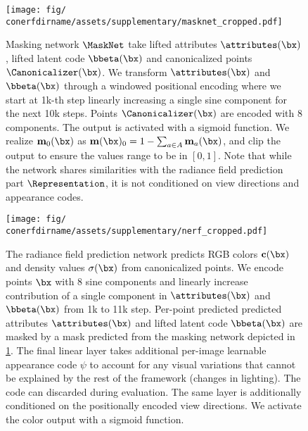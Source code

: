   \begin{figure}
    \centering
    \texttt{[image: fig/\\conerfdirname/assets/supplementary/masknet\_cropped.pdf]}
    \caption{Masking network $\MaskNet$ take lifted attributes $\attributes(\bx)$, lifted latent code $\bbeta(\bx)$ and canonicalized points $\Canonicalizer(\bx)$.
      We transform $\attributes(\bx)$ and $\bbeta(\bx)$ through a windowed
      positional encoding where we start at 1k-th step linearly increasing a
      single sine component for the next 10k steps.
      Points $\Canonicalizer(\bx)$ are encoded with 8 components.
      The output is activated with a sigmoid function.
      We realize $\mathbf{m}_0(\bx)$ as $\mathbf{m}(\bx)_0 = 1 - \sum_{a \in
      A} \mathbf{m}_a(\bx)$, and clip the output to ensure the values range to
      be in $[0,1]$.
      Note that while the network shares similarities with the radiance field
      prediction part $\Representation$, it is not conditioned on view
      directions and appearance codes.
    }
    \label{fig:conerf-masknet}
  \end{figure}

  \begin{figure}
    \centering
    \texttt{[image: fig/\\conerfdirname/assets/supplementary/nerf\_cropped.pdf]}
    \caption{The radiance field prediction network predicts RGB colors $\mathbf{c}(\bx)$ and density values $\sigma(\bx)$ from canonicalized points.
      We encode points $\bx$ with 8 sine components and linearly increase
      contribution of a single component in $\attributes(\bx)$ and
      $\bbeta(\bx)$ from 1k to 11k step.
      Per-point predicted predicted attributes $\attributes(\bx)$ and lifted
      latent code $\bbeta(\bx)$ are masked by a mask predicted from the
      masking network depicted in \cref{fig:conerf-masknet}.
      The final linear layer takes additional per-image learnable appearance
      code $\psi$ to account for any visual variations that cannot be
      explained by the rest of the framework (\eg changes in lighting).
      The code can discarded during evaluation.
      The same layer is additionally conditioned on the positionally encoded
      view directions.
      We activate the color output with a sigmoid function.
    }
    \label{fig:conerf-nerf}
  \end{figure}

